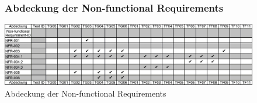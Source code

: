 \documentclass[oneside,a4paper,titlepage]{scrartcl}              %
\begin{document}
\begin{figure}[p]
  \subsubsection{Abdeckung der Non-functional Requirements}
  \centering\includegraphics[angle=90,scale=0.305]{imgs/Req_Test_Abdeckung_3.png}
  \caption{Abdeckung der Non-functional Requirements}
\end{figure}

\newpage

\end{document}

